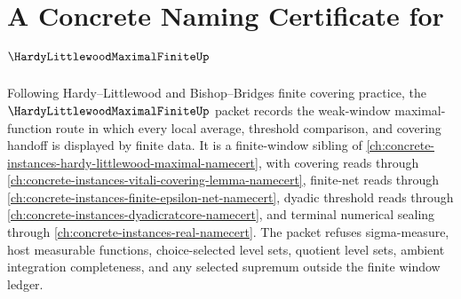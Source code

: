 \chapter{A Concrete Naming Certificate for $\HardyLittlewoodMaximalFiniteUp$}
\label{ch:concrete-instances-hardy-littlewood-maximal-finite-namecert}

Following Hardy--Littlewood and Bishop--Bridges finite covering practice, the $\HardyLittlewoodMaximalFiniteUp$ packet records the weak-window maximal-function route in which every local average, threshold comparison, and covering handoff is displayed by finite data. It is a finite-window sibling of \autoref{ch:concrete-instances-hardy-littlewood-maximal-namecert}, with covering reads through \autoref{ch:concrete-instances-vitali-covering-lemma-namecert}, finite-net reads through \autoref{ch:concrete-instances-finite-epsilon-net-namecert}, dyadic threshold reads through \autoref{ch:concrete-instances-dyadicratcore-namecert}, and terminal numerical sealing through \autoref{ch:concrete-instances-real-namecert}. The packet refuses sigma-measure, host measurable functions, choice-selected level sets, quotient level sets, ambient integration completeness, and any selected supremum outside the finite window ledger.

